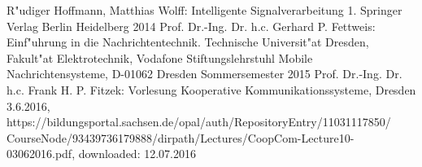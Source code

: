 \begin{thebibliography}{}
 R"udiger Hoffmann, Matthias Wolff: Intelligente Signalverarbeitung 1. Springer Verlag Berlin Heidelberg 2014
 Prof. Dr.-Ing. Dr. h.c. Gerhard P. Fettweis: Einf"uhrung in die Nachrichtentechnik. Technische Universit"at Dresden, Fakult"at Elektrotechnik, Vodafone Stiftungslehrstuhl Mobile Nachrichtensysteme, D-01062 Dresden Sommersemester 2015
 Prof. Dr.-Ing. Dr. h.c. Frank H. P. Fitzek: Vorlesung Kooperative Kommunikationssysteme, Dresden 3.6.2016, https://bildungsportal.sachsen.de/opal/auth/RepositoryEntry/11031117850/\\CourseNode/93439736179888/dirpath/Lectures/CoopCom-Lecture10-03062016.pdf, downloaded: 12.07.2016
\end{thebibliography}
